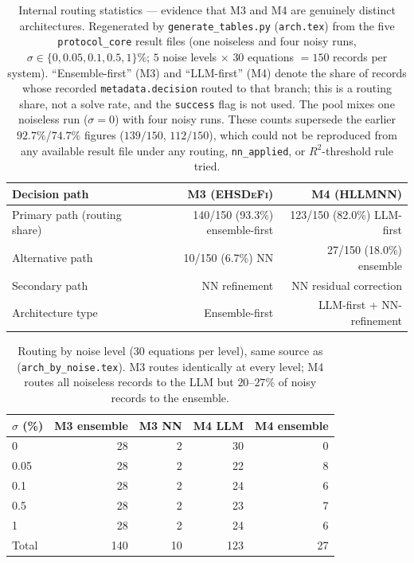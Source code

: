 \documentclass[twoside,11pt]{article}
\newcommand{\EHD}{\textsc{EHSDeFi}}
\newcommand{\HSL}{\textsc{HLLMNN}}
\newcommand{\Rsq}{R^{2}}
\begin{document}
\begin{table}[H]
\centering
\caption{Internal routing statistics --- evidence that M3 and M4 are genuinely
         distinct architectures. Regenerated by \texttt{generate\_tables.py}
         (\texttt{arch.tex}) from the five \texttt{protocol\_core} result
         files (one noiseless and four noisy runs,
         $\sigma\in\{0,0.05,0.1,0.5,1\}\%$; $5$ noise levels $\times$ $30$
         equations $= 150$ records per system). ``Ensemble-first'' (M3) and
         ``LLM-first'' (M4) denote the share of records whose recorded
         \texttt{metadata.decision} routed to that branch; this is a routing
         share, not a solve rate, and the \texttt{success} flag is not used.
         The pool mixes one noiseless run ($\sigma=0$) with four noisy runs.
         These counts supersede the earlier $92.7\%$/$74.7\%$ figures
         ($139/150$, $112/150$), which could not be reproduced from any
         available result file under any routing, \texttt{nn\_applied}, or
         $\Rsq$-threshold rule tried.}
\label{tab:arch}
\small
\begin{tabular}{L{3.5cm} r r}
\toprule
\textbf{Decision path} & \textbf{M3 (\EHD)} & \textbf{M4 (\HSL)}\\
\midrule
Primary path (routing share)
                & 140/150 (93.3\%) ensemble-first & 123/150 (82.0\%) LLM-first\\
Alternative path
                & 10/150 (6.7\%) NN              & 27/150 (18.0\%) ensemble\\
Secondary path  & NN refinement                  & NN residual correction\\
Architecture type & Ensemble-first               & LLM-first + NN-refinement\\
\bottomrule
\end{tabular}
\end{table}

\begin{table}[H]
\centering
\caption{Routing by noise level (30 equations per level), same source as
          (\texttt{arch\_by\_noise.tex}). M3 routes identically at every level; M4 routes all
         noiseless records to the LLM but $20$--$27\%$ of noisy records to the
         ensemble.}
\label{tab:arch_by_noise}
\small
\begin{tabular}{l r r r r}
\toprule
$\sigma$ (\%) & M3 ensemble & M3 NN & M4 LLM & M4 ensemble\\
\midrule
0      & 28 & 2 & 30 & 0\\
0.05   & 28 & 2 & 22 & 8\\
0.1    & 28 & 2 & 24 & 6\\
0.5    & 28 & 2 & 23 & 7\\
1      & 28 & 2 & 24 & 6\\
\midrule
Total  & 140 & 10 & 123 & 27\\
\bottomrule
\end{tabular}
\end{table}
\end{document}
